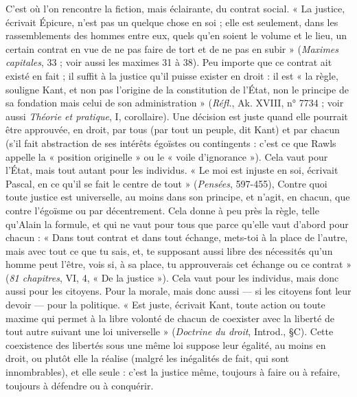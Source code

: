 C’est où l’on rencontre la fiction, mais éclairante, du contrat social. « La
justice, écrivait Épicure, n’est pas un quelque chose en soi ; elle est seulement,
dans les rassemblements des hommes entre eux, quels qu’en soient le volume et
le lieu, un certain contrat en vue de ne pas faire de tort et de ne pas en subir »
({\it Maximes capitales}, 33 ; voir aussi les maximes 31 à 38). Peu importe que ce
contrat ait existé en fait ; il suffit à la justice qu’il puisse exister en droit : il est
« la règle, souligne Kant, et non pas l’origine de la constitution de l’État, non
le principe de sa fondation mais celui de son administration » ({\it Réfl.}, Ak. XVIII,
n° 7734 ; voir aussi {\it Théorie et pratique}, I, corollaire). Une décision est juste
quand elle pourrait être approuvée, en droit, par tous (par tout un peuple, dit
Kant) et par chacun (s’il fait abstraction de ses intérêts égoïstes ou contingents :
c'est ce que Rawls appelle la « position originelle » ou le « voile d’ignorance »).
Cela vaut pour l’État, mais tout autant pour les individus. « Le moi est injuste
en soi, écrivait Pascal, en ce qu’il se fait le centre de tout » ({\it Pensées}, 597-455),
Contre quoi toute justice est universelle, au moins dans son principe, et n’agit,
en chacun, que contre l’égoïsme ou par décentrement. Cela donne à peu près
la règle, telle qu’Alain la formule, et qui ne vaut pour tous que parce qu’elle
vaut d’abord pour chacun : « Dans tout contrat et dans tout échange, mets-toi
à la place de l’autre, mais avec tout ce que tu sais, et, te supposant aussi libre
des nécessités qu’un homme peut l'être, vois si, à sa place, tu approuverais cet
échange ou ce contrat » ({\it 81 chapitres}, VI, 4, « De la justice »). Cela vaut pour
les individus, mais donc aussi pour les citoyens. Pour la morale, mais donc aussi
— si les citoyens font leur devoir — pour la politique. « Est juste, écrivait Kant,
toute action ou toute maxime qui permet à la libre volonté de chacun de
coexister avec la liberté de tout autre suivant une loi universelle » ({\it Doctrine du
droit}, Introd., \S C). Cette coexistence des libertés sous une même loi suppose
leur égalité, au moins en droit, ou plutôt elle la réalise (malgré les inégalités de
fait, qui sont innombrables), et elle seule : c’est la justice même, toujours à faire
ou à refaire, toujours à défendre ou à conquérir.

